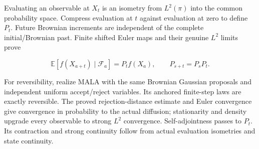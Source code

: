 \documentclass[11pt,a4paper]{article}
\begin{document}
Evaluating an observable at \(X_t\) is an isometry from
    \(L^2(\pi)\) into the common probability space. Compress evaluation at
    \(t\) against evaluation at zero to define \(P_t\).
    Future Brownian increments are independent of the complete
    initial/\allowbreak{}Brownian past. Finite shifted Euler maps and their genuine
    \(L^2\) limits prove


    \[\mathbb E[f(X_{a+t})\mid\mathcal F_a]=P_tf(X_a),
    \qquad P_{s+t}=P_sP_t.\]


For reversibility, realize MALA with the same Brownian Gaussian
    proposals and independent uniform accept/\allowbreak{}reject variables. Its anchored
    finite-step laws are exactly reversible. The proved rejection-distance
    estimate and Euler convergence give convergence in probability to the
    actual diffusion; stationarity and density upgrade every observable to
    strong \(L^2\) convergence. Self-adjointness passes to \(P_t\).
    Its contraction and strong continuity follow from actual evaluation
    isometries and state continuity.
\end{document}
